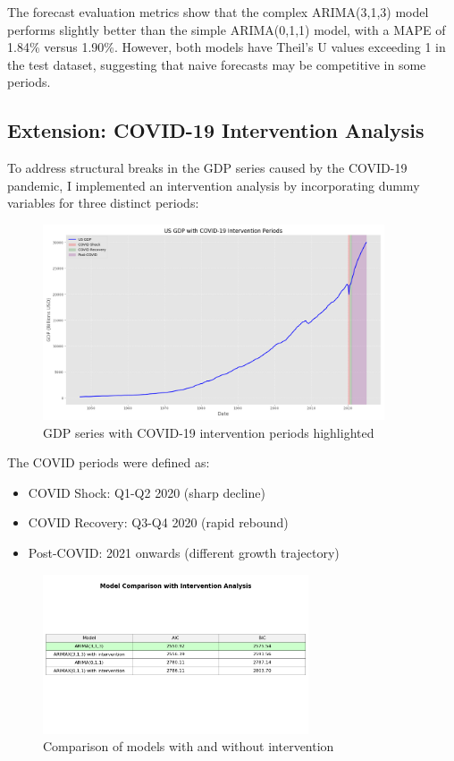 \documentclass[11pt,a4paper]{article}
\begin{document}
The forecast evaluation metrics show that the complex ARIMA(3,1,3) model performs slightly better than the simple ARIMA(0,1,1) model, with a MAPE of 1.84\% versus 1.90\%. However, both models have Theil's U values exceeding 1 in the test dataset, suggesting that naive forecasts may be competitive in some periods.

\subsection{Extension: COVID-19 Intervention Analysis}

To address structural breaks in the GDP series caused by the COVID-19 pandemic, I implemented an intervention analysis by incorporating dummy variables for three distinct periods:

\begin{figure}[H]
    \centering
    \includegraphics[width=0.9\textwidth]{plots/arima/gdp/intervention/gdp_with_interventions.png}
    \caption{GDP series with COVID-19 intervention periods highlighted}
    \label{fig:gdp_interventions}
\end{figure}

The COVID periods were defined as:
\begin{itemize}
    \item COVID Shock: Q1-Q2 2020 (sharp decline)
    \item COVID Recovery: Q3-Q4 2020 (rapid rebound)
    \item Post-COVID: 2021 onwards (different growth trajectory)
\end{itemize}

\begin{figure}[H]
    \centering
    \includegraphics[width=0.7\textwidth]{plots/arima/gdp/intervention/model_comparison_table.png}
    \caption{Comparison of models with and without intervention}
    \label{fig:intervention_comparison}
\end{figure}
\end{document}
